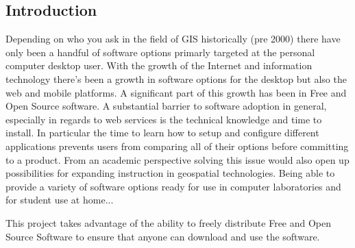 \documentclass[12pt,letterpaper]{article}
\begin{document}
\subsection{Introduction}
	Depending on who you ask in the field of GIS historically (pre 2000) there have only been a handful of software options primarly targeted at the personal computer desktop user. With the growth of the Internet and information technology there's been a growth in software options for the desktop but also the web and mobile platforms. A significant part of this growth has been in Free and Open Source software.
	A substantial barrier to software adoption in general, especially in regards to web services is the technical knowledge and time to install. In particular the time to learn how to setup and configure different applications prevents users from comparing all of their options before committing to a product. 
	From an academic perspective solving this issue would also open up possibilities for expanding instruction in geospatial technologies. Being able to provide a variety of software options ready for use in computer laboratories and for student use at home...

This project takes advantage of the ability to freely distribute Free and Open Source Software to ensure that anyone can download and use the software.

%
\end{document}
